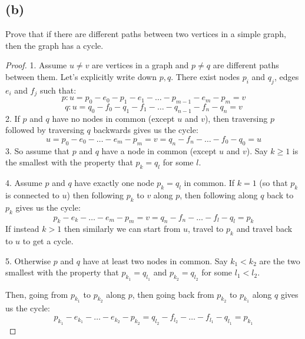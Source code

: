 \documentclass[14pt]{extarticle}
\begin{document}
\subsection{(b)}
Prove that if there are different paths between two vertices in a simple graph, then the graph has a cycle.
\begin{proof}
1. Assume $u \neq v$ are vertices in a graph and $p \neq q$ are different paths between them. Let's explicitly write down $p, q$. There exist nodes $p_i$ and $q_j$, edges $e_i$ and $f_j$ such that:
$$
p: u = p_0 - e_0 - p_1 - e_1 - \ldots - p_{m-1} - e_m - p_m = v
$$
$$
q: u = q_0 - f_0 - q_1 - f_1 - \ldots - q_{n-1} - f_n - q_n = v
$$
2. If $p$ and $q$ have no nodes in common (except $u$ and $v$), then traversing $p$ followed by traversing $q$ backwards gives us the cycle:
$$
u = p_0 - e_0 - \ldots - e_m - p_m = v = q_n - f_n - \ldots - f_0 - q_0 = u
$$
3. So assume that $p$ and $q$ have a node in common (except $u$ and $v$). Say $k \geq 1$ is the smallest with the property that $p_k = q_l$ for some $l$.

4. Assume $p$ and $q$ have exactly one node $p_k = q_l$ in common. If $k = 1$ (so that $p_k$ is connected to $u$) then following $p_k$ to $v$ along $p$, then following along $q$ back to $p_k$ gives us the cycle:
$$
p_k - e_k - \ldots - e_m - p_m = v = q_n - f_n - \ldots - f_l - q_l = p_k
$$
If instead $k > 1$ then similarly we can start from $u$, travel to $p_k$ and travel back to $u$ to get a cycle.

5. Otherwise $p$ and $q$ have at least two nodes in common. Say $k_1 < k_2$ are the two smallest with the property that $p_{k_1} = q_{l_1}$ and $p_{k_2} = q_{l_2}$ for some $l_1 < l_2$. 

Then, going from $p_{k_1}$ to $p_{k_2}$ along $p$, then going back from $p_{k_2}$ to $p_{k_1}$ along $q$ gives us the cycle:
$$
p_{k_1} - e_{k_1} - \ldots - e_{k_2} - p_{k_2} = q_{l_2} - f_{l_2} - \ldots - f_{l_1} - q_{l_1} = p_{k_1}
$$
\end{proof}
\end{document}

